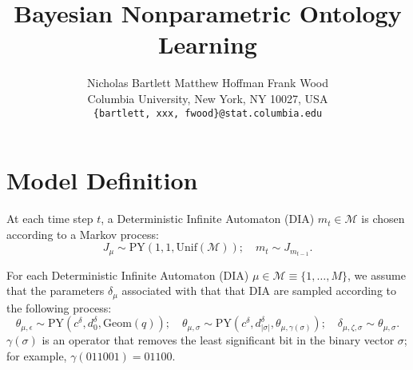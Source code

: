 \documentclass{article}
\title{Bayesian Nonparametric Ontology Learning}
\author{
Nicholas Bartlett \hspace{1cm} Matthew Hoffman \hspace{1cm} Frank Wood\\
Columbia University, New York, NY 10027, USA \\
\texttt{\{bartlett, xxx, fwood\}@stat.columbia.edu}
}
\newcommand{\PY}{\textrm{PY}}
\newcommand{\geom}{\textrm{Geom}}
\newcommand{\unif}{\textrm{Unif}}
\begin{document}
\maketitle




\section{Model Definition}


At each time step $t$, a Deterministic Infinite Automaton (DIA) $m_t
\in \mathcal{M}$ is chosen according to a Markov process:
\begin{equation}
J_\mu \sim \PY(1, 1, \unif(\mathcal{M}));\quad
m_t \sim J_{m_{t-1}}.
\end{equation}

For each Deterministic Infinite Automaton (DIA) $\mu \in \mathcal{M}
\equiv \{1,\ldots,M\}$, we assume that the parameters $\delta_\mu$
associated with that that DIA are sampled according to the following
process:
\begin{equation}
\theta_{\mu,\epsilon} \sim \PY(c^{\delta}, d^{\delta}_{0},\geom(q)); \quad
\theta_{\mu,\sigma} \sim \PY(c^{\delta}, d^{\delta}_{|\sigma|},
\theta_{\mu,\gamma(\sigma)}); \quad
\delta_{\mu,\zeta,\sigma} \sim \theta_{\mu,\sigma}.
\end{equation}
$\gamma(\sigma)$ is an operator that removes the least significant bit
in the binary vector $\sigma$; for example, $\gamma(011001)=01100$.
\end{document}
